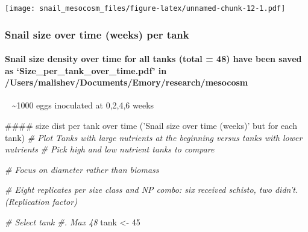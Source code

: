 \documentclass[10,portrait]{article}
\newenvironment{Shaded}{\begin{snugshade}}{\end{snugshade}}
\newcommand{\DecValTok}[1]{\textcolor[rgb]{0.00,0.00,0.81}{#1}}
\newcommand{\StringTok}[1]{\textcolor[rgb]{0.31,0.60,0.02}{#1}}
\newcommand{\CommentTok}[1]{\textcolor[rgb]{0.56,0.35,0.01}{\textit{#1}}}
\newcommand{\NormalTok}[1]{#1}
\let\oldparagraph\paragraph
\renewcommand{\paragraph}[1]{\oldparagraph{#1}\mbox{}}
\begin{document}
\texttt{[image: snail\_mesocosm\_files/figure-latex/unnamed-chunk-12-1.pdf]}

\subsubsection{Snail size over time (weeks) per
tank}\label{snail-size-over-time-weeks-per-tank}

\paragraph{\texorpdfstring{Snail size density over time for all tanks
(total = 48) have been saved as `Size\_per\_tank\_over\_time.pdf' in
/Users/malishev/Documents/Emory/research/mesocosm}{Snail size density over time for all tanks (total = 48) have been saved as Size\_per\_tank\_over\_time.pdf in /Users/malishev/Documents/Emory/research/mesocosm}}\label{snail-size-density-over-time-for-all-tanks-total-48-have-been-saved-as-size_per_tank_over_time.pdf-in-usersmalishevdocumentsemoryresearchmesocosm}

~ \textasciitilde{}1000 eggs inoculated at 0,2,4,6 weeks

\begin{Shaded}
\begin{Highlighting}[]
\NormalTok{#### size dist per tank over time ('Snail size over time (weeks)' but for each tank)}
\CommentTok{# Plot Tanks with large nutrients at the beginning versus tanks with lower nutrients}
\CommentTok{# Pick high and low nutrient tanks to compare}

\CommentTok{# Focus on diameter rather than biomass}

\CommentTok{# Eight replicates per size class and NP combo: six received schisto, two didn't. (Replication factor)}
\end{Highlighting}
\end{Shaded}

\begin{Shaded}
\begin{Highlighting}[]
\CommentTok{# Select tank #. Max 48   }
\NormalTok{tank <-}\StringTok{ }\DecValTok{45}
\end{Highlighting}
\end{Shaded}
\end{document}
